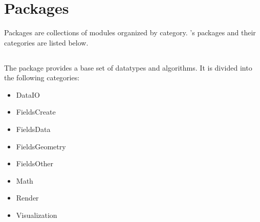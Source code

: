 %
% 
% 
% 
% 
% 
%

%

\chapter{Packages}
\label{ch:packages}

Packages are collections of modules organized by category. \sr{}'s 
packages and their categories are listed below. 

\section{\sr{}}
\label{sec:srpackage}

The \sr{} package provides a base set of datatypes and algorithms.  It
is divided into the following categories:

\begin{itemize}
  \item DataIO
  \item FieldsCreate
  \item FieldsData
  \item FieldsGeometry
  \item FieldsOther
  \item Math
  \item Render
  \item Visualization
\end{itemize}

